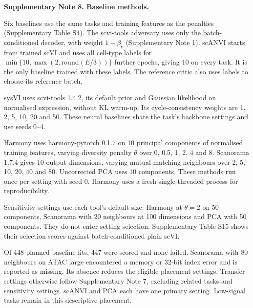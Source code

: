 \medskip\noindent\textbf{Supplementary Note 8. Baseline methods.}\par\smallskip
\begingroup\small\setlength{\parskip}{3pt}
Six baselines use the same tasks and training features as the penalties (Supplementary Table S4). The scvi-tools adversary uses only the batch-conditioned decoder, with weight $1-\beta_e$ (Supplementary Note 1). scANVI starts from trained scVI and uses all cell-type labels for $\min\{10,\max(2,\mathrm{round}(E/3))\}$ further epochs, giving 10 on every task. It is the only baseline trained with these labels. The reference critic also uses labels to choose its reference batch.

sysVI uses scvi-tools 1.4.2, its default prior and Gaussian likelihood on normalised expression, without KL warm-up. Its cycle-consistency weights are 1, 2, 5, 10, 20 and 50. These neural baselines share the task's backbone settings and use seeds 0--4.

Harmony uses harmony-pytorch 0.1.7 on 10 principal components of normalised training features, varying diversity penalty $\theta$ over 0, 0.5, 1, 2, 4 and 8. Scanorama 1.7.4 gives 10 output dimensions, varying mutual-matching neighbours over 2, 5, 10, 20, 40 and 80. Uncorrected PCA uses 10 components. These methods run once per setting with seed 0. Harmony uses a fresh single-threaded process for reproducibility.

Sensitivity settings use each tool's default size: Harmony at $\theta=2$ on 50 components, Scanorama with 20 neighbours at 100 dimensions and PCA with 50 components. They do not enter setting selection. Supplementary Table S15 shows their selection scores against batch-conditioned plain scVI.

Of 448 planned baseline fits, 447 were scored and none failed. Scanorama with 80 neighbours on ATAC large encountered a memory or 32-bit index error and is reported as missing. Its absence reduces the eligible placement settings. Transfer settings otherwise follow Supplementary Note 7, excluding related tasks and sensitivity settings. scANVI and PCA each have one primary setting. Low-signal tasks remain in this descriptive placement.
\par\endgroup

